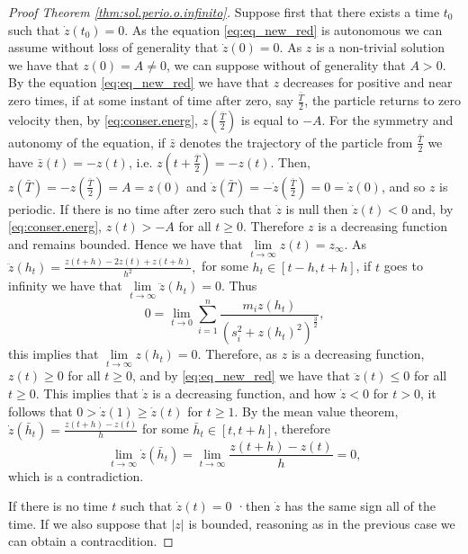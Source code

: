 \documentclass[twoside]{article}
\theoremstyle{remark}
\begin{document}
\begin{proof}[Proof  Theorem \ref{thm:sol.perio.o.infinito}]







Suppose first that there exists a time $t_0$ such that $\dot{z}(t_0)=0$. As the equation \eqref{eq:eq_new_red} is autonomous we can assume without loss of generality that $\dot{z}(0)=0$. As $z$ is a non-trivial solution we have that $z(0)=A\neq 0$, we can suppose without of generality that $A>0$. By the equation \eqref{eq:eq_new_red}  we have that $z$ decreases for positive and near zero times, if at some instant of time after zero, say $\frac{\bar{T}}{2}$, the particle returns to zero velocity then, by \eqref{eq:conser.energ}, $z\left(\frac{\bar{T}}{2}\right)$ is equal to $-A$. For the symmetry and autonomy of the equation, if $\bar{z}$ denotes the trajectory of the particle from  $\frac{\bar{T}}{2}$ we have $ \bar{z} (t) = - z (t) $, i.e. $z (t +\frac{\bar{T}}{2}) = -z (t)$. Then, $ z (\bar{T}) = - z \left(\frac{\bar{T}}{2}\right) = A=z(0) $ and $\dot{z} (\bar{T}) = - \dot{z} \left(\frac{\bar{T}}{2}\right) = 0 =\dot{z}(0)$, and so $z$ is periodic. If there is no time after zero such 
that $\dot{z}$ is null then $\dot{z}(t)<0$ and, by \eqref{eq:conser.energ}, $z(t)>-A$ for all $t\geq 0$. Therefore $z$ is a decreasing function and remains bounded. Hence  we have that $\lim\limits_{t\to \infty}z(t)=z_{\infty}$. As
$\ddot{z}(h_t)=\frac{z(t+h)-2z(t)+z(t+h)}{h^2},$
for some $h_t\in [t-h,t+h]$, if  $t$ goes to infinity we have that $\lim\limits_{t\to\infty}\ddot{z}(h_t)=0$.  Thus \[0=\lim\limits_{t\to 0}\sum_{i=1}^{n}\frac{m_i z(h_t)}{(s_i^2+z(h_t)^2)^{\frac32}},\] this implies that $\lim\limits_{t\to\infty}z(h_t)=0$. Therefore, as $z$ is a decreasing function,  $z(t)\geq 0$ for all $t\geq 0$, and by \eqref{eq:eq_new_red} we have that $\ddot{z}(t)\leq 0$ for all $t\geq 0$. This implies that $\dot{z}$ is a decreasing function, and how $\dot{z}< 0$ for $t>0$, it follows that $0>\dot{z}(1)\geq \dot{z}(t)$ for $t\geq 1$. By the mean value theorem, $\dot{z}(\bar{h}_t)=\frac{z(t+h)-z(t)}{h}$ for some $\bar{h}_t\in [t,t+h]$, therefore 
\[\lim\limits_{t\to \infty}\dot{z}(\bar{h}_t)=\lim\limits_{t\to \infty}\frac{z(t+h)-z(t)}{h}=0,\]
which is a contradiction.

If there is no time $t$ such that $\dot{z}(t)=0$ ·then $\dot{z}$ has the same sign all of the time. If we also suppose that $|z|$ is bounded, reasoning as in the previous case we can obtain a contracdition. 


\end{proof}
\end{document}

